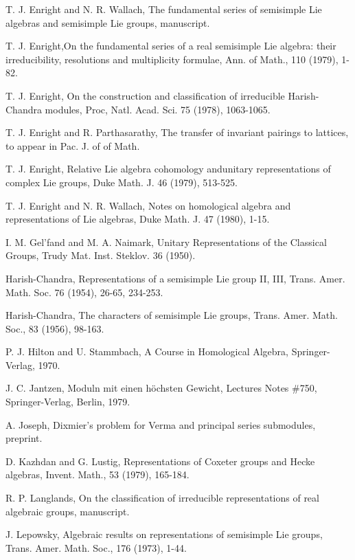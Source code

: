 \begin{thebibliography}{99}
 T. J. Enright and N. R. Wallach, The fundamental
  series of semisimple Lie algebras and semisimple Lie groups,
  manuscript. 

 T. J. Enright,\pageoriginale On the fundamental series
  of a real semisimple Lie algebra: their irreducibility, resolutions
  and multiplicity formulae, Ann. of Math., 110 (1979), 1-82. 

 T. J. Enright, On the construction and classification
  of irreducible Harish-Chandra modules, Proc, Natl. Acad. Sci. 75
  (1978), 1063-1065. 

 T. J. Enright and R. Parthasarathy, The transfer of
  invariant pairings to lattices, to appear in Pac. J. of of Math. 


 T. J. Enright, Relative Lie algebra cohomology
  andunitary representations of complex Lie groups, Duke Math. J. 46
  (1979), 513-525. 

 T. J. Enright and N. R. Wallach, Notes on homological
  algebra and representations of Lie algebras, Duke Math. J. 47
  (1980), 1-15. 

 I. M. Gel'fand and M. A. Naimark, Unitary
  Representations of the Classical Groups, Trudy
  Mat. Inst. Steklov. 36 (1950). 

 Harish-Chandra, Representations of a semisimple Lie
  group II, III, Trans. Amer. Math. Soc. 76 (1954), 26-65, 234-253. 

 Harish-Chandra, The characters of semisimple Lie
  groups, Trans. Amer. Math. Soc., 83 (1956), 98-163. 

 P. J. Hilton and U. Stammbach, A Course in Homological
  Algebra, Springer-Verlag, 1970. 

 J. C. Jantzen, Moduln mit einen h\"ochsten Gewicht,
  Lectures Notes \#750, Springer-Verlag, Berlin, 1979. 

 A. Joseph, Dixmier's problem for Verma and principal
  series submodules, preprint. 

 D. Kazhdan and G. Lustig, Representations of Coxeter
  groups and Hecke algebras, Invent. Math., 53 (1979), 165-184. 

 R. P. Langlands, On the classification of irreducible
  representations of real algebraic groups, manuscript. 

 J. Lepowsky, Algebraic results on representations of
  semisimple Lie groups, Trans. Amer. Math. Soc., 176 (1973), 1-44. 


\end{thebibliography}
